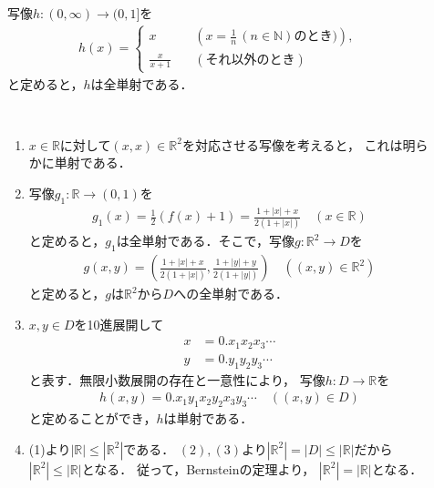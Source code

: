 \begin{description}
\item[] \mbox{} \\
  写像$h: (0, \infty) \longrightarrow (0, 1]$を
  \begin{align*}
    h(x) = \left \{
      \begin{aligned}
        x \qquad & \left( x= \frac{1}{n} \, ( n \in \mathbb{N} ) \text{のとき} ) \right) , \\
        \frac{x}{x+1} \quad & ( \text{それ以外のとき} )
      \end{aligned}
      \right.
  \end{align*}
  と定めると，$h$は全単射である．

\item[] \mbox{} \\
  \begin{enumerate}
    \item $x \in \mathbb{R}$に対して$(x,x) \in \mathbb{R}^2$を対応させる写像を考えると，
      これは明らかに単射である．
    \item 写像$g_1 : \mathbb{R} \longrightarrow (0,1)$を
      \begin{align*}
        g_1(x) = \frac{1}{2} (f(x) + 1 ) = \frac{1+ \lvert x \rvert +x}{2(1+ \lvert x \rvert)}
        \quad ( x \in \mathbb{R} )
      \end{align*}
      と定めると，$g_1$は全単射である．そこで，写像$g: \mathbb{R}^2 \longrightarrow D$を
      \begin{align*}
        g(x,y) 
        = \left( \frac{1+ \lvert x \rvert + x } {2(1+ \lvert x \rvert ) } , 
        \frac{1+ \lvert y \rvert +y }{2(1+ \lvert y \rvert )} \right)
        \quad ( (x,y) \in \mathbb{R}^2 )
      \end{align*}
      と定めると，$g$は$\mathbb{R}^2$から$D$への全単射である．
    \item $x, y \in D$を10進展開して
      \begin{align*}
        x & = 0. x_1 x_2 x_3 \cdots \\
        y & = 0. y_1 y_2 y_3 \cdots 
      \end{align*}
      と表す．無限小数展開の存在と一意性により，
      写像$h: D \longrightarrow \mathbb{R}$を
      \begin{align*}
        h(x,y) = 0.x_1 y_1 x_2 y_2 x_3 y_3 \cdots \quad ( (x,y) \in D ) 
      \end{align*}
      と定めることができ，$h$は単射である．
     \item (1)より$\lvert \mathbb{R} \rvert \leq                                                       
      \left \lvert \mathbb{R}^2 \right \rvert$である．
      $(2),(3)$より$\left \lvert \mathbb{R}^2 \right \rvert = \lvert D \rvert 
      \leq \lvert \mathbb{R} \rvert$だから$\left \lvert \mathbb{R}^2 \right \rvert 
      \leq \lvert \mathbb{R} \rvert $となる．
      従って，Bernsteinの定理より，
      $\left \lvert \mathbb{R} ^2 \right \rvert = \lvert \mathbb{R} \rvert$となる．
  \end{enumerate}


\end{description}
